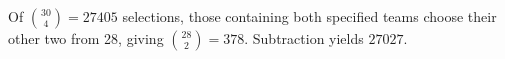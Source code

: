 Of $\binom{30}{4}=27405$ selections, those containing both specified teams choose their other two from 28, giving $\binom{28}{2}=378$. Subtraction yields $\boxed{27027}$.
